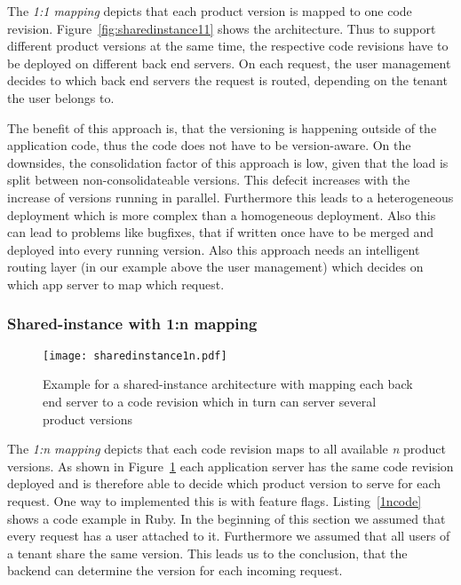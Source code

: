 The \emph{1:1 mapping} depicts that each product version is mapped to one code revision. Figure~\ref{fig:sharedinstance11} shows the architecture. Thus to support different product versions at the same time, the respective code revisions have to be deployed on different back end servers. On each request, the user management decides to which back end servers the request is routed, depending on the tenant the user belongs to.

The benefit of this approach is, that the versioning is happening outside of the application code, thus the code does not have to be version-aware. On the downsides, the consolidation factor of this approach is low, given that the load is split between non-consolidateable versions. This defecit increases with the increase of versions running in parallel. Furthermore this leads to a heterogeneous deployment which is more complex than a homogeneous deployment.  Also this can lead to problems like bugfixes, that if written once have to be merged and deployed into every running version. Also this approach needs an intelligent routing layer (in our example above the user management) which decides on which app server to map which request.

%
%

\subsubsection{Shared-instance with 1:n mapping}
\label{sec:shared1n}

\begin{figure}
\centering
\texttt{[image: sharedinstance1n.pdf]}
\caption{Example for a shared-instance architecture with mapping each back end server to a code revision which in turn can server several product versions}
\label{fig:sharedinstance1n}
\end{figure}

The \emph{1:n mapping} depicts that each code revision maps to all available \emph{n} product versions. As shown in Figure~\ref{fig:sharedinstance1n} each application server has the same code revision deployed and is therefore able to decide which product version to serve for each request. One way to implemented this is with feature flags. Listing~\ref{1ncode} shows a code example in Ruby. In the beginning of this section we assumed that every request has a user attached to it. Furthermore we assumed that all users of a tenant share the same version. This leads us to the conclusion, that the backend can determine the version for each incoming request.


